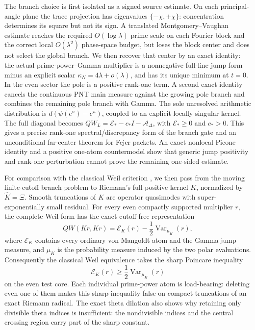 \documentclass[11pt]{amsart}
\theoremstyle{definition}
\theoremstyle{remark}
\begin{document}
The branch choice is first isolated as a signed source estimate.  On
each principal-angle plane the trace projection has eigenvalues
\(\{-\chi,+\chi\}\): concentration determines its square but not its sign.
A translated Montgomery--Vaughan estimate reaches the required
\(O(\log\lambda)\) prime scale on each Fourier block and the correct local
\(O(\lambda^2)\) phase-space budget, but loses the block center and does not
select the global branch.  We then recover that center by an exact identity:
the actual prime-power--Gamma multiplier is a nonnegative full-line jump
form minus an explicit scalar \(\kappa_N=4\lambda+o(\lambda)\), and has its
unique minimum at \(t=0\).  In the even sector the pole is a positive
rank-one term.  A second exact identity cancels the continuous PNT main
measure against the growing pole branch and combines the remaining pole
branch with Gamma.  The sole unresolved arithmetic distribution is
\(d(\psi(e^u)-e^u)\), coupled to an explicit locally singular kernel.
The full diagonal becomes
\(QW_L=\mathcal E_*-c_*I-\mathcal A_\Delta\), with
\(\mathcal E_*\ge0\) and \(c_*>0\).  This gives a precise rank-one
spectral/discrepancy form of the branch gate and an unconditional
far-center theorem for Fejer packets.  An exact nonlocal Picone identity
and a positive one-atom countermodel show that generic jump positivity and
rank-one perturbation cannot prove the remaining one-sided estimate.

For comparison with the classical Weil criterion \cite{Weil1952}, we then pass from the
moving finite-cutoff branch problem to Riemann's full positive kernel
\(K\), normalized by \(\widehat K=\Xi\).  Smooth truncations
of \(K\) are operator quasimodes with super-exponentially small residual.
For every even compactly supported multiplier \(r\), the complete Weil form
has the exact cutoff-free representation
\[
 QW(Kr,Kr)=\mathscr E_K(r)-\frac12\operatorname{Var}_{\mu_K}(r),
\]
where \(\mathscr E_K\) contains every ordinary von Mangoldt atom and the
Gamma jump measure, and \(\mu_K\) is the probability measure induced by the
two polar evaluations.  Consequently the classical Weil equivalence takes
the sharp
Poincare inequality
\[
 \mathscr E_K(r)\ge\frac12\operatorname{Var}_{\mu_K}(r)
\]
on the even test core.  Each individual prime-power atom is load-bearing:
deleting even one of them makes this sharp inequality false on compact
truncations of an exact Riemann radical.  The exact theta dilation also shows
why retaining only divisible theta indices is insufficient: the
nondivisible indices and the central crossing region carry part of the sharp
constant.
\end{document}
